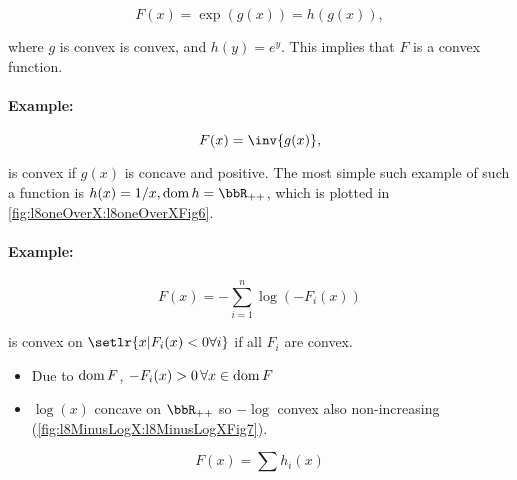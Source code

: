 \begin{dmath}\label{eqn:convexOptimizationLecture8:260}
F(x) = \exp( g(x) ) = h( g(x) ),
\end{dmath}

where \( g \) is convex is convex, and \( h(y) = e^y \).  This implies that \( F \) is a convex function.

\paragraph{Example:}

\begin{dmath}\label{eqn:convexOptimizationLecture8:280}
F(x) = \inv{g(x)},
\end{dmath}

is convex if \( g(x) \) is concave and positive.  The most simple such example of such a function is \( h(x) = 1/x, \dom h = \bbR_{++} \), which is plotted in \cref{fig:l8oneOverX:l8oneOverXFig6}.


\paragraph{Example:}

\begin{equation}\label{eqn:convexOptimizationLecture8:300}
F(x) = - \sum_{i = 1}^n \log( -F_i(x) )
\end{equation}

is convex on \( \setlr{ x | F_i(x) < 0 \forall i } \) if all \( F_i \) are convex.

\begin{itemize}
\item Due to \( \operatorname{dom} F \), \( -F_i(x) > 0 \,\forall x \in \operatorname{dom} F \)
\item \( \log(x) \) concave on \( \bbR_{++} \) so \( -\log \) convex also non-increasing (\cref{fig:l8MinusLogX:l8MinusLogXFig7}).


\end{itemize}

\begin{dmath}\label{eqn:convexOptimizationLecture8:320}
F(x) = \sum h_i(x)
\end{dmath}

